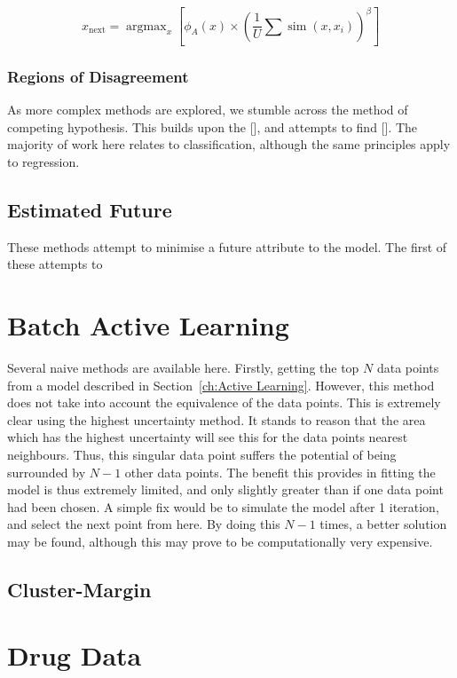 \documentclass[a4paper, english]{report}
\DeclareMathOperator*{\argmax}{argmax}
\DeclareMathOperator*{\simm}{sim}
\begin{document}
\begin{equation}
    \label{eq:Settles_denisty}
    x_\mathrm{next}=\argmax_x{\left[\phi_A(x)\times{\left(\frac{1}{U}\sum{\simm{(x, x_i)}}\right)}^\beta\right]}
\end{equation}

\subsubsection{Regions of Disagreement}
As more complex methods are explored, we stumble across the method of competing hypothesis. This builds upon the [], and attempts to find []. The majority of work here relates to classification, although the same principles apply to regression.

\subsection{Estimated Future}
These methods attempt to minimise a future attribute to the model. The first of these attempts to
\section{Batch Active Learning}
Several naive methods are available here. Firstly, getting the top $N$ data points from a model described in Section~\ref{ch:Active Learning}. However, this method does not take into account the equivalence of the data points. This is extremely clear using the highest uncertainty method. It stands to reason that the area which has the highest uncertainty will see this for the data points nearest neighbours. Thus, this singular data point suffers the potential of being surrounded by $N-1$ other data points. The benefit this provides in fitting the model is thus extremely limited, and only slightly greater than if one data point had been chosen. A simple fix would be to simulate the model after 1 iteration, and select the next point from here. By doing this $N-1$ times, a better solution may be found, although this may prove to be computationally very expensive.
\subsection{Cluster-Margin}
\section{Drug Data}
\blindtext[2]{}

\printbibliography{}
\appendix
\end{document}

